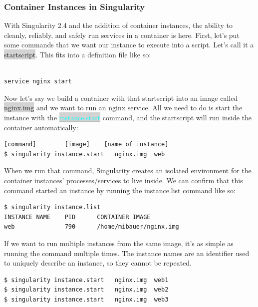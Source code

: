 \documentclass[a4paper]{article}
\begin{document}
\subsubsection{Container Instances in Singularity}

With Singularity 2.4 and the addition of container instances, the ability to cleanly, reliably, and safely run services in a container is here. First, let’s put some commands that we want our instance to execute into a script. Let’s call it a \colorbox{lightgray}{startscript}. This fits into a definition file like so:

\begin{lstlisting}[frame=single]  
%startscript

service nginx start
\end{lstlisting}

Now let’s say we build a container with that startscript into an image called \colorbox{lightgray}{nginx.img} and we want to run an nginx service. All we need to do is start the instance with the \colorbox{lightgray}{\hyperref[sec:instancestart]{{\textcolor{cyan}{instance.start}}}} command, and the startscript will run inside the container automatically:

\begin{lstlisting}[frame=single]  
              [command]        [image]    [name of instance]
$ singularity instance.start   nginx.img  web
\end{lstlisting}

When we run that command, Singularity creates an isolated environment for the container instances’ processes/services to live inside. We can confirm that this command started an instance by running the instance.list command like so:

\begin{lstlisting}[frame=single] 
$ singularity instance.list
INSTANCE NAME    PID      CONTAINER IMAGE
web              790      /home/mibauer/nginx.img
\end{lstlisting}

If we want to run multiple instances from the same image, it’s as simple as running the command multiple times. The instance names are an identifier used to uniquely describe an instance, so they cannot be repeated.

\begin{lstlisting}[frame=single] 
$ singularity instance.start   nginx.img  web1
$ singularity instance.start   nginx.img  web2
$ singularity instance.start   nginx.img  web3
\end{lstlisting}
\end{document}
